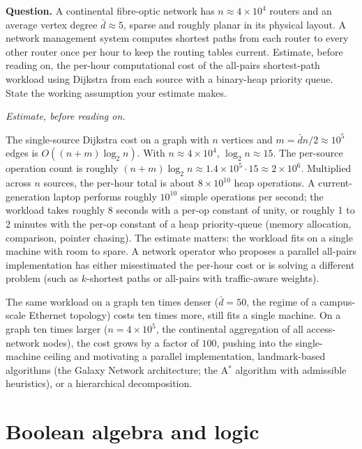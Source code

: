 \begin{estimation}
\textbf{Question.} A continental fibre-optic network has $n
\approx 4 \times 10^{4}$ routers and an average vertex degree
$\bar{d} \approx 5$, sparse and roughly planar in its physical
layout. A network management system computes shortest paths from
each router to every other router once per hour to keep the routing
tables current. Estimate, before reading on, the per-hour
computational cost of the all-pairs shortest-path workload using
Dijkstra from each source with a binary-heap priority queue. State
the working assumption your estimate makes.

\smallskip
\textit{Estimate, before reading on.}

\smallskip
The single-source Dijkstra cost on a graph with $n$ vertices and
$m = \bar{d} n / 2 \approx 10^{5}$ edges is $O((n + m) \log_{2}
n)$. With $n \approx 4 \times 10^{4}$, $\log_{2} n \approx 15$.
The per-source operation count is roughly $(n + m) \log_{2} n
\approx 1.4 \times 10^{5} \cdot 15 \approx 2 \times 10^{6}$.
Multiplied across $n$ sources, the per-hour total is about
$8 \times 10^{10}$ heap operations. A current-generation laptop
performs roughly $10^{10}$ simple operations per second; the
workload takes roughly 8 seconds with a per-op constant of unity,
or roughly 1 to 2 minutes with the per-op constant of a heap
priority-queue (memory allocation, comparison, pointer chasing).
The estimate matters: the workload fits on a single machine with
room to spare. A network operator who proposes a parallel
all-pairs implementation has either misestimated the per-hour cost
or is solving a different problem (such as $k$-shortest paths or
all-pairs with traffic-aware weights).

The same workload on a graph ten times denser ($\bar{d} = 50$, the
regime of a campus-scale Ethernet topology) costs ten times more,
still fits a single machine. On a graph ten times larger ($n = 4
\times 10^{5}$, the continental aggregation of all access-network
nodes), the cost grows by a factor of $100$, pushing into the
single-machine ceiling and motivating a parallel implementation,
landmark-based algorithms (the Galaxy Network architecture; the
A$^{*}$ algorithm with admissible heuristics), or a hierarchical
decomposition.
\end{estimation}

\section{Boolean algebra and logic}

